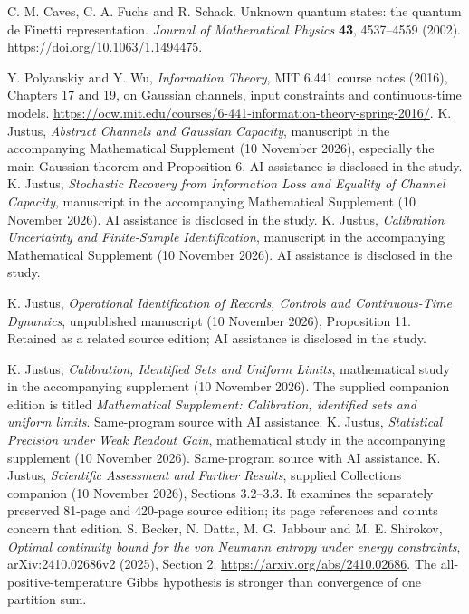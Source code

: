 C. M. Caves, C. A. Fuchs and R. Schack.
Unknown quantum states: the quantum de Finetti representation.
\emph{Journal of Mathematical Physics} \textbf{43}, 4537--4559 (2002).
\url{https://doi.org/10.1063/1.1494475}.

 Y. Polyanskiy and Y. Wu, \emph{Information Theory}, MIT 6.441 course notes (2016), Chapters 17 and 19, on Gaussian channels, input constraints and continuous-time models. \url{https://ocw.mit.edu/courses/6-441-information-theory-spring-2016/}.
 K. Justus, \emph{Abstract Channels and Gaussian Capacity}, manuscript in the accompanying Mathematical Supplement (10 November 2026), especially the main Gaussian theorem and Proposition 6. AI assistance is disclosed in the study.
 K. Justus, \emph{Stochastic Recovery from Information Loss and Equality of Channel Capacity}, manuscript in the accompanying Mathematical Supplement (10 November 2026). AI assistance is disclosed in the study.
 K. Justus, \emph{Calibration Uncertainty and Finite-Sample Identification}, manuscript in the accompanying Mathematical Supplement (10 November 2026). AI assistance is disclosed in the study.

 K. Justus, \emph{Operational Identification of Records, Controls and Continuous-Time Dynamics}, unpublished manuscript (10 November 2026), Proposition 11. Retained as a related source edition; AI assistance is disclosed in the study.

 K. Justus, \emph{Calibration, Identified Sets and Uniform Limits}, mathematical study in the accompanying supplement (10 November 2026). The supplied companion edition is titled \emph{Mathematical Supplement: Calibration, identified sets and uniform limits}. Same-program source with AI assistance.
 K. Justus, \emph{Statistical Precision under Weak Readout Gain}, mathematical study in the accompanying supplement (10 November 2026). Same-program source with AI assistance.
 K. Justus, \emph{Scientific Assessment and Further Results}, supplied Collections companion (10 November 2026), Sections 3.2--3.3. It examines the separately preserved 81-page and 420-page source edition; its page references and counts concern that edition.
 S. Becker, N. Datta, M. G. Jabbour and M. E. Shirokov, \emph{Optimal continuity bound for the von Neumann entropy under energy constraints}, arXiv:2410.02686v2 (2025), Section 2. \url{https://arxiv.org/abs/2410.02686}. The all-positive-temperature Gibbs hypothesis is stronger than convergence of one partition sum.
